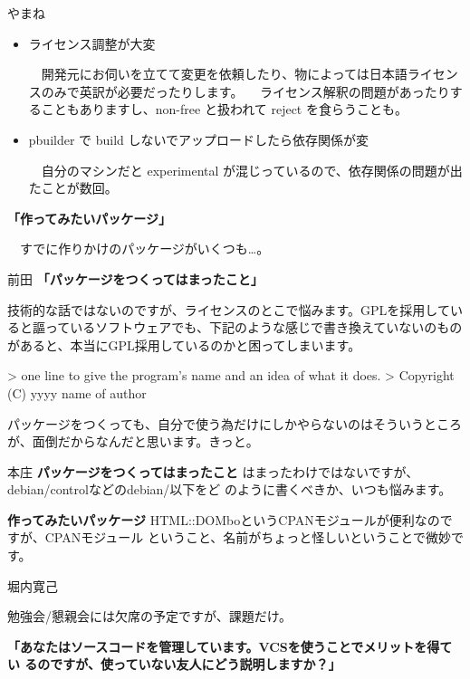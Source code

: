 \documentclass[cjk,dvipdfmx,12pt]{beamer}
\begin{document}
\begin{frame}{やまね}
\begin{itemize}
 \item  ライセンス調整が大変

 　開発元にお伺いを立てて変更を依頼したり、物によっては日本語ライセンスのみで英訳が必要だったりします。
 　ライセンス解釈の問題があったりすることもありますし、non-free と扱われて reject を食らうことも。

 \item  pbuilder で build しないでアップロードしたら依存関係が変

 　自分のマシンだと experimental が混じっているので、依存関係の問題が出たことが数回。
\end{itemize}

\textbf{「作ってみたいパッケージ」}

　すでに作りかけのパッケージがいくつも…。

\end{frame}\begin{frame}[containsverbatim]{前田}
\textbf{「パッケージをつくってはまったこと」}

技術的な話ではないのですが、ライセンスのとこで悩みます。GPLを採用していると謳っているソフトウェアでも、下記のような感じで書き換えていないのものがあると、本当にGPL採用しているのかと困ってしまいます。

\begin{commandline}
 > one line to give the program's name and an idea of what it does.
 > Copyright (C) yyyy name of author
\end{commandline}

パッケージをつくっても、自分で使う為だけにしかやらないのはそういうところが、面倒だからなんだと思います。きっと。

\end{frame}\begin{frame}{本庄}
\textbf{パッケージをつくってはまったこと}
はまったわけではないですが、debian/controlなどのdebian/以下をど
のように書くべきか、いつも悩みます。

\textbf{作ってみたいパッケージ}
HTML::DOMboというCPANモジュールが便利なのですが、CPANモジュール
ということ、名前がちょっと怪しいということで微妙です。


\end{frame}\begin{frame}{堀内寛己}

勉強会/懇親会には欠席の予定ですが、課題だけ。

\textbf{「あなたはソースコードを管理しています。VCSを使うことでメリットを得てい
るのですが、使っていない友人にどう説明しますか？」}


\end{frame}
\end{document}
